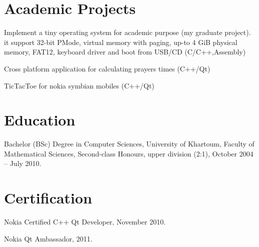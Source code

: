 \documentclass[letterpaper]{article}
\renewenvironment{itemize}{
  \begin{list}{}{
    \setlength{\leftmargin}{1.5em}
  }
}{
  \end{list}
}
\begin{document}
\section*{Academic Projects}
\begin{itemize}
\item Implement a tiny operating system for academic purpose (my graduate project). it support 32-bit PMode, virtual memory with paging, up-to 4 GiB physical memory, FAT12, keyboard driver and boot from USB/CD (C/C++,Assembly)
\item Cross platform application for calculating prayers times (C++/Qt)
\item TicTacToe for nokia symbian mobiles (C++/Qt)
\end{itemize}

\section*{Education}
\begin{itemize}
\item Bachelor (BSc) Degree in Computer Sciences, University of Khartoum, Faculty of Mathematical Sciences, Second-class Honours, upper division (2:1), October 2004 -- July 2010.
\end{itemize}


\section*{Certification}
\begin{itemize}
\item Nokia Certified C++ Qt Developer, November 2010.
\item Nokia Qt Ambassador, 2011.
\end{itemize}
\end{document}
